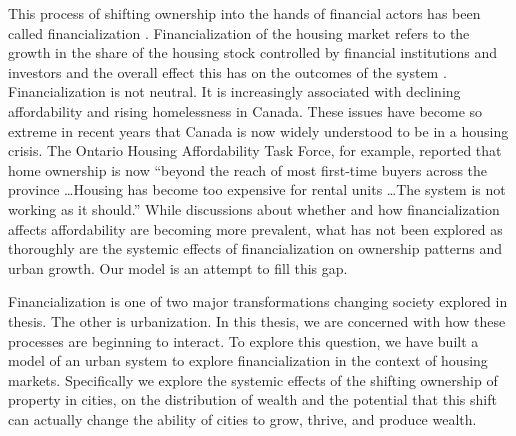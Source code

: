 This process of shifting ownership into the hands of financial actors has been called financialization \cite{farhaReportFinancializationHousing2017, hansenFinanceCapitalismFinancialization2014, tomaskovic-deveyFinancializationCausesInequality2013, palleyFinancializationWhatIt2007, seccarecciaUnderstandingFinancializationHistory2013, nemtinFinancializationHousingSocial2021}.  
Financialization of the housing market refers to the growth in the share of the housing stock controlled by financial institutions and investors and the overall effect this has on the outcomes of the system \cite{farhaReportFinancializationHousing2017, hansenFinanceCapitalismFinancialization2014}. %
Financialization is not neutral. It is increasingly associated with declining affordability and rising homelessness in Canada. These issues have become so extreme in recent years that Canada is now widely understood to be in a housing crisis. The Ontario Housing Affordability Task Force, for example, reported that home ownership is now ``beyond the reach of most first-time buyers across the province \dots Housing has become too expensive for rental units \dots The system is not working as it should.'' While discussions about whether and how financialization affects affordability are becoming more prevalent, what has not been explored as thoroughly are the systemic effects of financialization on ownership patterns and urban growth. Our model is an attempt to fill this gap.%

Financialization is one of two major transformations changing society explored in thesis. The other is urbanization. In this thesis, we are concerned with how these processes are beginning to interact. To explore this question, we have built a model of an urban system to explore financialization in the context of housing markets. Specifically we explore the systemic effects of the shifting ownership of property in cities, on the distribution of wealth and the potential that this shift can actually change the ability of cities to grow, thrive, and produce wealth.


